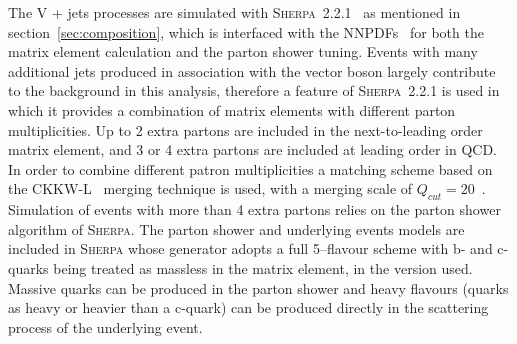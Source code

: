 The V + jets processes are simulated with
\textsc{Sherpa}~2.2.1~\cite{1126-6708-2009-02-007} as mentioned in
section~\ref{sec:composition}, which is interfaced with the
NNPDFs~\cite{Ball:2012cx} for both the matrix element calculation and the parton shower
tuning. Events with many additional jets produced in association with the vector
boson largely contribute to the background in this analysis, therefore a feature
of \textsc{Sherpa}~2.2.1 is used in which it provides a combination of matrix
elements with different parton multiplicities. Up to 2 extra partons are
included in the next-to-leading order matrix element, and 3 or 4 extra partons
are included at leading order in QCD. In order to combine different patron
multiplicities a matching scheme based on the CKKW-L~\cite{Lonnblad:2001iq,
  Lavesson:2005xu} merging technique is used, with a merging scale of $Q_{cut} =
20$~\GeV. Simulation of events with more than 4 extra partons relies on the
parton shower algorithm of \textsc{Sherpa}. The parton shower and underlying
events models are included in \textsc{Sherpa} whose generator adopts a full
5--flavour scheme with b- and c-quarks being treated as massless in the matrix
element, in the version used. Massive quarks can be produced in the parton
shower and heavy flavours (quarks as heavy or heavier than a c-quark) can be
produced directly in the scattering process of the underlying event.

